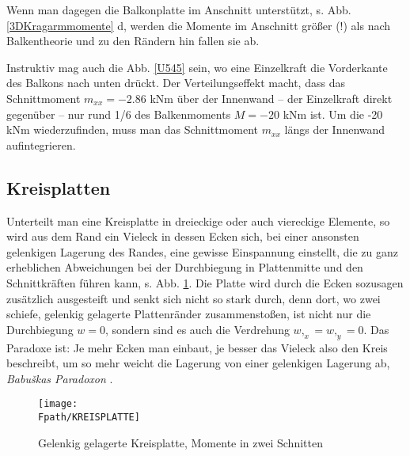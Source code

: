 Wenn man dagegen die Balkonplatte im Anschnitt unterst\"{u}tzt, s. Abb. \ref{3DKragarmmomente} d, werden die Momente im Anschnitt gr\"{o}{\ss}er (!) als nach Balkentheorie und zu den R\"{a}ndern hin fallen sie ab.

Instruktiv mag auch die Abb. \ref{U545} sein, wo eine Einzelkraft die Vorderkante  des Balkons nach unten dr\"{u}ckt. Der Verteilungseffekt macht, dass das Schnittmoment $m_{xx} = -2.86$ kNm \"{u}ber der Innenwand -- der Einzelkraft direkt gegen\"{u}ber -- nur rund 1/6 des Balkenmoments $M = - 20$ kNm ist. Um die -20 kNm wiederzufinden, muss man das Schnittmoment $m_{xx}$ l\"{a}ngs der Innenwand aufintegrieren.

{\textcolor{sectionTitleBlue}{\section{Kreisplatten}}}\label{Kreisplatten}
Unterteilt man eine Kreisplatte in dreieckige oder auch viereckige Elemente, so wird aus dem Rand ein Vieleck in dessen Ecken sich, bei einer ansonsten gelenkigen Lagerung des Randes, eine gewisse Einspannung einstellt, die zu ganz erheblichen Abweichungen bei der Durchbiegung in Plattenmitte und den Schnittkr\"{a}ften f\"{u}hren kann, s. Abb. \ref{Kreisplatte}. Die Platte wird durch die Ecken sozusagen zus\"{a}tzlich ausgesteift und senkt sich nicht so stark durch, denn dort, wo zwei schiefe, gelenkig gelagerte Plattenr\"{a}nder zusammensto{\ss}en, ist nicht nur die Durchbiegung $w = 0$, sondern sind es auch die Verdrehung $w,_x = w,_y = 0$. Das Paradoxe ist: Je mehr Ecken man einbaut, je besser das Vieleck also den Kreis beschreibt, um so mehr weicht die Lagerung von einer gelenkigen Lagerung ab, {\em Babu\v{s}kas Paradoxon} \cite{babpit}.
\begin{figure}[tbp]
\centering
\if {} \sidecaption \fi
\texttt{[image: \\Fpath/KREISPLATTE]}
\caption{Gelenkig gelagerte Kreisplatte, Momente in zwei Schnitten} \label{Kreisplatte}
\end{figure}%

